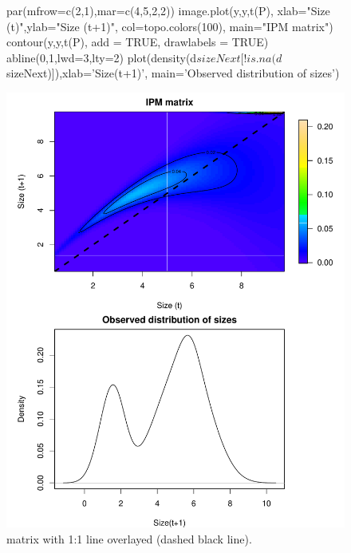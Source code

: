 \documentclass[11pt]{article}
\begin{document}
\begin{figure}[H]
\begin{center}
\begin{Schunk}
\begin{Sinput}
     par(mfrow=c(2,1),mar=c(4,5,2,2))    
     image.plot(y,y,t(P), xlab="Size (t)",ylab="Size (t+1)",
        col=topo.colors(100), main="IPM matrix")
     contour(y,y,t(P), add = TRUE, drawlabels = TRUE)
     abline(0,1,lwd=3,lty=2)
     plot(density(d$sizeNext[!is.na(d$sizeNext)]),xlab='Size(t+1)',
        main='Observed distribution of sizes')
\end{Sinput}
\end{Schunk}
\includegraphics{IPM_Guide_Appendix_A-fig_kernel1to1}
\caption{matrix with 1:1 line overlayed (dashed black line).}
\label{fig:fig_kernel1to1}
\end{center}
\end{figure}

\end{document}
